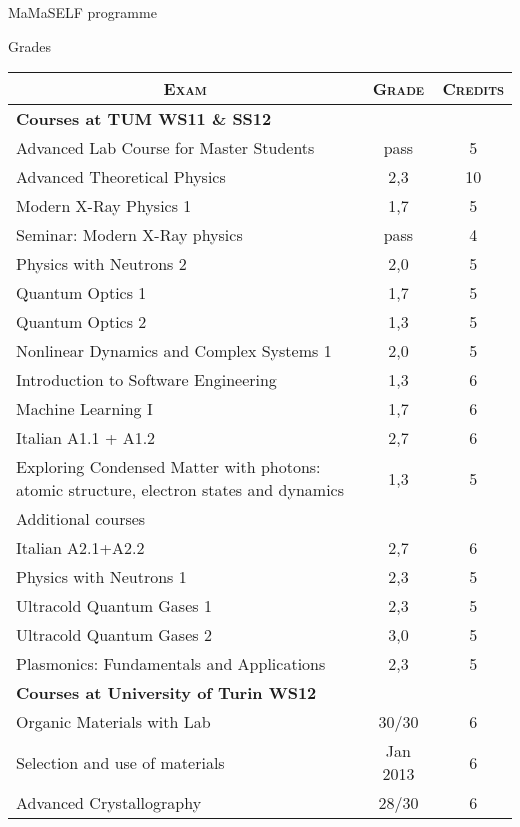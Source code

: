 \documentclass[a4paper,10pt]{article}
\begin{document}
\par{\centering\Large \hypertarget{MSC}{MaMaSELF programme}\par} \large{\centering Grades\par}\normalsize
\begin{center}
 \begin{tabular}{p{7.3cm} c c}
\multicolumn{1}{c}{\textsc{Exam}}&\textsc{Grade}&\textsc{Credits}\\ \hline
\multicolumn{1}{l}{\textbf{Courses at TUM WS11 \& SS12}}&&\\ \hline
 Advanced Lab Course for Master Students & pass & 5 \\ 
Advanced Theoretical Physics & 2,3 & 10 \\
Modern X-Ray Physics 1 & 1,7 & 5\\
Seminar: Modern X-Ray physics & pass & 4\\
Physics with Neutrons 2 & 2,0 & 5\\
Quantum Optics 1 & 1,7 & 5\\
Quantum Optics 2 & 1,3 & 5\\
Nonlinear Dynamics and Complex Systems 1 & 2,0 & 5\\
Introduction to Software Engineering & 1,3 & 6\\
Machine Learning I & 1,7 & 6\\
Italian A1.1 + A1.2 & 2,7 & 6\\
Exploring Condensed Matter with photons: atomic structure, electron states and dynamics & 1,3 & 5\\ \hline
Additional courses \\ \hline
Italian A2.1+A2.2 & 2,7 & 6\\
Physics with Neutrons 1 & 2,3 & 5\\
Ultracold Quantum Gases 1 & 2,3 & 5\\
Ultracold Quantum Gases 2 & 3,0 & 5\\
Plasmonics: Fundamentals and Applications & 2,3 & 5\\  \hline
\multicolumn{1}{l}{\textbf{Courses at University of Turin WS12}}&&\\ \hline
Organic Materials with Lab &30/30 & 6 \\
Selection and use of materials & Jan 2013 & 6 \\
Advanced Crystallography & 28/30 & 6 \\
 \end{tabular}
\end{center}
\bigskip
\newpage
\end{document}
